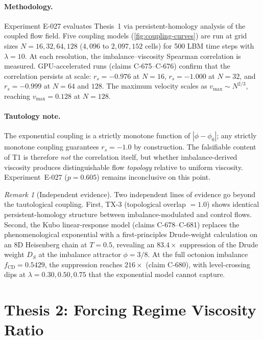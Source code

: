 \documentclass[12pt,openany]{report}
\theoremstyle{definition}
\theoremstyle{plain}
\theoremstyle{remark}
\newtheorem{remark}{Remark}[chapter]
\begin{document}
\paragraph{Methodology.}
Experiment E-027 evaluates Thesis~1 via persistent-homology analysis of the
coupled flow field.  Five coupling models (\cref{fig:coupling-curves}) are
run at grid sizes $N = 16, 32, 64, 128$ ($4{,}096$ to $2{,}097{,}152$
cells) for 500 LBM time steps with $\lambda = 10$.  At each resolution,
the imbalance--viscosity Spearman correlation is measured.  GPU-accelerated
runs (claims C-675--C-676) confirm that the correlation persists at scale:
$r_s = -0.976$ at $N = 16$, $r_s = -1.000$ at $N = 32$, and $r_s = -0.999$
at $N = 64$ and $128$.  The maximum velocity scales as
$v_{\max} \sim N^{2/3}$, reaching $v_{\max} = 0.128$ at $N = 128$.

\paragraph{Tautology note.}
The exponential coupling is a strictly monotone function of
$|\phi - \phi_0|$; any strictly monotone coupling guarantees $r_s = -1.0$
by construction.  The falsifiable content of T1 is therefore
\emph{not} the correlation itself, but whether imbalance-derived viscosity
produces distinguishable flow \emph{topology} relative to uniform
viscosity.  Experiment~E-027 ($p = 0.605$) remains inconclusive on this
point.

\begin{remark}[Independent evidence]
Two independent lines of evidence go beyond the tautological coupling.
First, TX-3 (topological overlap $= 1.0$) shows identical
persistent-homology structure between imbalance-modulated and control flows.
Second, the Kubo linear-response model (claims C-678--C-681)
replaces the phenomenological exponential with a first-principles
Drude-weight calculation on an 8D Heisenberg chain at $T = 0.5$, revealing
an $83.4\times$ suppression of the Drude weight $D_S$ at the imbalance
attractor $\phi = 3/8$.  At the full octonion imbalance
$f_{\mathrm{CD}} = 0.5429$, the suppression reaches $216\times$ (claim
C-680), with level-crossing dips at $\lambda = 0.30, 0.50, 0.75$ that the
exponential model cannot capture.
\end{remark}

\section{Thesis 2: Forcing Regime Viscosity Ratio}
\end{document}

